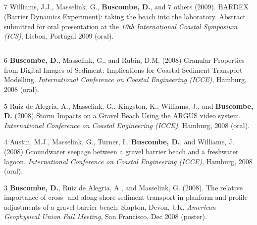 \documentclass[margin,line]{resume}
\begin{document}
\begin{resume}
\begin{footnotesize}
	\subsection{}
	\begin{list1}
	\item[7] Williams, J.J., Masselink, G., {\bf Buscombe, D.}, and 7 others (2009). BARDEX (Barrier Dynamics Experiment): taking the beach into the laboratory. Abstract submitted for oral presentation at the {\sl 10th International Coastal Symposium (ICS)}, Lisbon, Portugal 2009 (oral).
	\end{list1}

	\subsection{}
	\begin{list1}
	\item[6] {\bf Buscombe, D.}, Masselink, G., and Rubin, D.M. (2008) Granular Properties from Digital Images of Sediment: Implications for Coastal Sediment Transport Modelling. {\sl International Conference on Coastal Engineering (ICCE)}, Hamburg, 2008 (oral).\\
	
	\item[5] Ruiz de Alegria, A., Masselink, G., Kingston, K., Williams, J., and {\bf Buscombe, D.} (2008) Storm Impacts on a Gravel Beach Using the ARGUS video system. {\sl International Conference on Coastal Engineering (ICCE)}, Hamburg, 2008 (oral).\\
	
	\item[4] Austin, M.J., Masselink, G., Turner, I., {\bf Buscombe, D.}, and Williams, J. (2008) Groundwater seepage between a gravel barrier beach and a freshwater lagoon. {\sl International Conference on Coastal Engineering (ICCE)}, Hamburg, 2008 (oral).\\
	
	\item[3] {\bf Buscombe, D.}, Ruiz de Alegria, A., and Masselink, G. (2008). The relative importance of cross- and along-shore sediment transport in planform and profile adjustments of a gravel barrier beach: Slapton, Devon, UK. {\sl American Geophysical Union Fall Meeting}, San Francisco, Dec 2008 (poster).
	\end{list1}
	
	\subsection{}


\end{footnotesize}
\end{resume}
\end{document}
